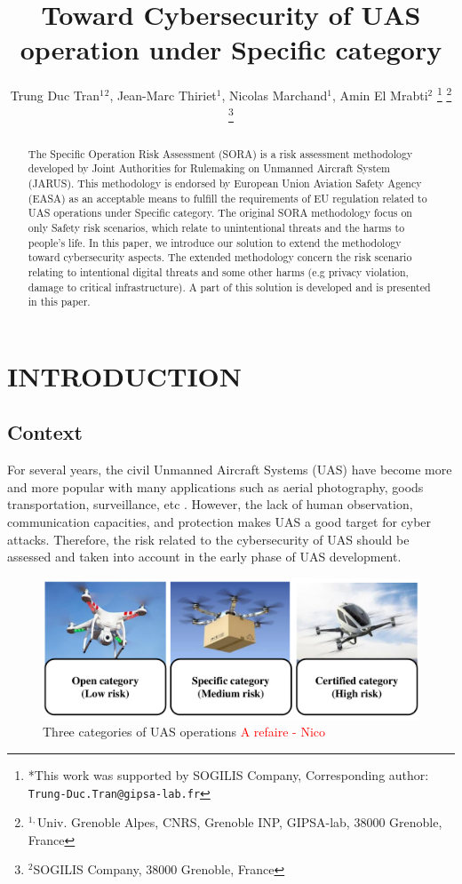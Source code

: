 \documentclass[a4paper, 10, conference]{ieeeconf}  %
\title{\LARGE \bf
Toward Cybersecurity of UAS operation under Specific category
}
\author{Trung Duc Tran$^{1}$$^{2}$, Jean-Marc Thiriet$^{1}$, Nicolas Marchand$^{1}$, Amin El Mrabti$^{2}$%
	\thanks{*This work was supported by SOGILIS Company, Corresponding author: {\tt\small Trung-Duc.Tran@gipsa-lab.fr}}%
	\thanks{$^{1,}$Univ. Grenoble Alpes, CNRS, Grenoble INP, GIPSA-lab, 38000 Grenoble, France}%
	\thanks{$^{2}$SOGILIS Company, 38000 Grenoble, France}
}
\begin{document}



\maketitle


\begin{abstract}
 The Specific Operation Risk Assessment (SORA) is a risk assessment methodology developed by Joint Authorities for Rulemaking on Unmanned Aircraft System (JARUS). This methodology is endorsed by European Union Aviation Safety Agency (EASA) as an acceptable means to fulfill the requirements of EU regulation related to UAS operations under Specific category. The original SORA methodology focus on only Safety risk scenarios, which relate to unintentional threats and the harms to people's life. In this paper, we introduce our solution to extend the methodology toward cybersecurity aspects. The extended methodology concern the risk scenario relating to intentional digital threats and some other harms (e.g privacy violation, damage to critical infrastructure). A part of this solution is developed and is presented in this paper.  
\end{abstract}


\section{INTRODUCTION}
\subsection{Context}
For several years, the civil Unmanned Aircraft Systems (UAS) have become more and more popular with many applications such as aerial photography, goods transportation, surveillance, etc \cite{vattapparamban_drones_2016}. However, the lack of human observation, communication capacities, and protection makes UAS a good target for cyber attacks. Therefore, the risk related to the cybersecurity of UAS should be assessed and taken into account in the early phase of UAS development.

\begin{figure}[!ht]
	\centering
	\includegraphics[width=3.3 in]{image/3categories.pdf}
	\caption{Three categories of UAS operations \textcolor{red}{A refaire - Nico}}
	\label{fig: riskscenario}
\end{figure}    
\end{document}
